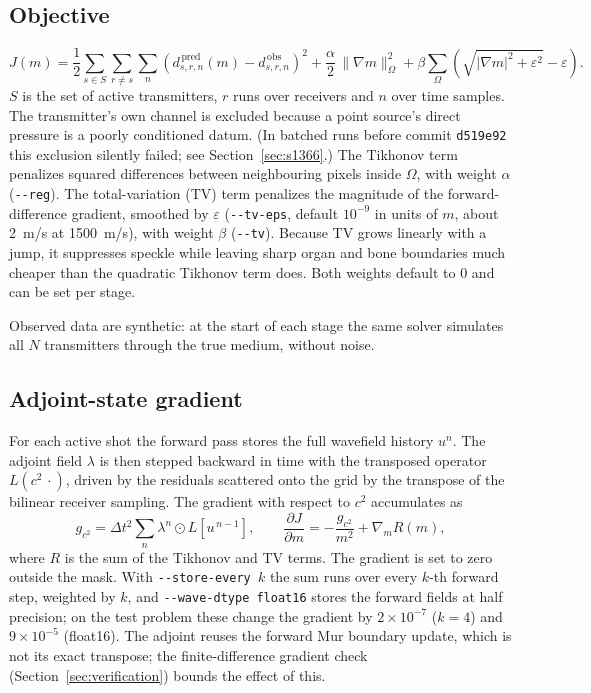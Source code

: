 \documentclass[11pt]{article}
\newcommand{\code}[1]{\texttt{#1}}
\begin{document}
\subsection{Objective}

\begin{equation}
  J(m) = \frac{1}{2}\sum_{s \in S}\sum_{r \neq s}\sum_{n}
  \left(d^{\,\mathrm{pred}}_{s,r,n}(m) - d^{\,\mathrm{obs}}_{s,r,n}\right)^2
  + \frac{\alpha}{2}\,\lVert \nabla m \rVert^2_{\Omega}
  + \beta \sum_{\Omega} \left(\sqrt{\lvert \nabla m \rvert^2 + \varepsilon^2} - \varepsilon\right).
\end{equation}
$S$ is the set of active transmitters, $r$ runs over receivers and $n$ over
time samples. The transmitter's own channel is excluded because a point
source's direct pressure is a poorly conditioned datum. (In batched runs
before commit \code{d519e92} this exclusion silently failed; see
Section~\ref{sec:s1366}.) The Tikhonov term penalizes squared differences
between neighbouring pixels inside $\Omega$, with weight $\alpha$
(\code{-{}-reg}). The total-variation (TV) term penalizes the magnitude of the
forward-difference gradient, smoothed by $\varepsilon$ (\code{-{}-tv-eps},
default $10^{-9}$ in units of $m$, about 2~m/s at 1500~m/s), with weight
$\beta$ (\code{-{}-tv}). Because TV grows linearly with a jump, it suppresses
speckle while leaving sharp organ and bone boundaries much cheaper than the
quadratic Tikhonov term does. Both weights default to 0 and can be set per
stage.

Observed data are synthetic: at the start of each stage the same solver
simulates all $N$ transmitters through the true medium, without noise.

\subsection{Adjoint-state gradient}

For each active shot the forward pass stores the full wavefield history $u^n$.
The adjoint field $\lambda$ is then stepped backward in time with the transposed
operator $L(c^2\,\cdot)$, driven by the residuals scattered onto the grid by
the transpose of the bilinear receiver sampling. The gradient with respect to
$c^2$ accumulates as
\begin{equation}
  g_{c^2} = \Delta t^2 \sum_{n} \lambda^{n} \odot L\!\left[u^{\,n-1}\right],
  \qquad
  \frac{\partial J}{\partial m} = -\frac{g_{c^2}}{m^2} + \nabla_m R(m),
\end{equation}
where $R$ is the sum of the Tikhonov and TV terms. The gradient is set to zero
outside the mask. With \code{-{}-store-every $k$} the sum runs over every
$k$-th forward step, weighted by $k$, and \code{-{}-wave-dtype float16} stores
the forward fields at half precision; on the test problem these change the
gradient by $2\times10^{-7}$ ($k = 4$) and $9\times10^{-5}$ (float16). The
adjoint reuses the forward Mur
boundary update, which is not its exact transpose; the finite-difference
gradient check (Section~\ref{sec:verification}) bounds the effect of this.
\end{document}
